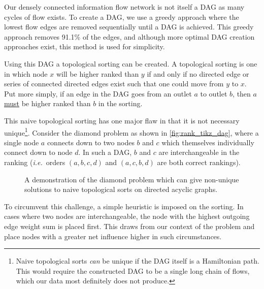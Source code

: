 Our densely connected information flow network is not itself a DAG as many cycles of flow exists. To create a DAG, we use a greedy approach where the lowest flow edges are removed sequentially until a DAG is achieved. This greedy approach removes 91.1\% of the edges, and although more optimal DAG creation approaches exist, this method is used for simplicity. 

Using this DAG a topological sorting can be created. A topological sorting is one in which node $x$ will be higher ranked than $y$ if and only if no directed edge or series of connected directed edges exist such that one could move from $y$ to $x$. Put more simply, if an edge in the DAG goes from an outlet $a$ to outlet $b$, then $a$ \underline{must} be higher ranked than $b$ in the sorting.

This naive topological sorting has one major flaw in that it is not necessary unique\footnote{Naive topological sorts \emph{can} be unique if the DAG itself is a Hamiltonian path. This would require the constructed DAG to be a single long chain of flows, which our data most definitely does not produce.}. Consider the diamond problem as shown in \autoref{fig:rank_tikz_dag}, where a single node $a$ connects down to two nodes $b$ and $c$ which themselves individually connect down to node $d$. In such a DAG, $b$ and $c$ are interchangeable in the ranking (\emph{i.e.}\ orders $(a,b,c,d)$ and $(a,c,b,d)$ are both correct rankings).

\begin{figure}[!htbp]
\centering
{}
\caption{A demonstration of the diamond problem which can give non-unique solutions to naive topological sorts on directed acyclic graphs.}\label{fig:rank_tikz_dag}
\end{figure}

To circumvent this challenge, a simple heuristic is imposed on the sorting. In cases where two nodes are interchangeable, the node with the highest outgoing edge weight sum is placed first. This draws from our context of the problem and place nodes with a greater net influence higher in such circumstances.

